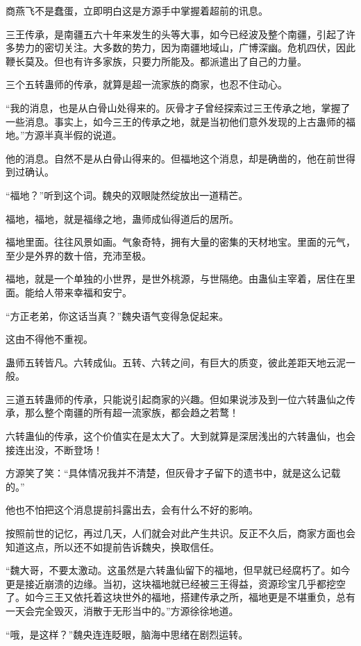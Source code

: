 \begin{this_body}
商燕飞不是蠢蛋，立即明白这是方源手中掌握着超前的讯息。

三王传承，是南疆五六十年来发生的头等大事，如今已经波及整个南疆，引起了许多势力的密切关注。大多数的势力，因为南疆地域山，广博深幽。危机四伏，因此鞭长莫及。但也有许多家族，只要力所能及。都派遣出了自己的力量。

三个五转蛊师的传承，就算是超一流家族的商家，也忍不住动心。

“我的消息，也是从白骨山处得来的。灰骨才子曾经探索过三王传承之地，掌握了一些消息。事实上，如今三王的传承之地，就是当初他们意外发现的上古蛊师的福地。”方源半真半假的说道。

他的消息。自然不是从白骨山得来的。但福地这个消息，却是确凿的，他在前世得到过确认。

“福地？”听到这个词。魏央的双眼陡然绽放出一道精芒。

福地，福地，就是福缘之地，蛊师成仙得道后的居所。

福地里面。往往风景如画。气象奇特，拥有大量的密集的天材地宝。里面的元气，至少是外界的数十倍，充沛至极。

福地，就是一个单独的小世界，是世外桃源，与世隔绝。由蛊仙主宰着，居住在里面。能给人带来幸福和安宁。

“方正老弟，你这话当真？”魏央语气变得急促起来。

这由不得他不重视。

蛊师五转皆凡。六转成仙。五转、六转之间，有巨大的质变，彼此差距天地云泥一般。

三道五转蛊师的传承，只能说引起商家的兴趣。但如果说涉及到一位六转蛊仙之传承，那么整个南疆的所有超一流家族，都会趋之若鹜！

六转蛊仙的传承，这个价值实在是太大了。大到就算是深居浅出的六转蛊仙，也会接连出没，不断登场！

方源笑了笑：“具体情况我并不清楚，但灰骨才子留下的遗书中，就是这么记载的。”

他也不怕把这个消息提前抖露出去，会有什么不好的影响。

按照前世的记忆，再过几天，人们就会对此产生共识。反正不久后，商家方面也会知道这点，所以还不如提前告诉魏央，换取信任。

“魏大哥，不要太激动。这虽然是六转蛊仙留下的福地，但早就已经腐朽了。如今更是接近崩溃的边缘。当初，这块福地就已经被三王得益，资源珍宝几乎都挖空了。如今三王又依托着这块世外的福地，搭建传承之所，福地更是不堪重负，总有一天会完全毁灭，消散于无形当中的。”方源徐徐地道。

“哦，是这样？”魏央连连眨眼，脑海中思绪在剧烈运转。


\end{this_body}
